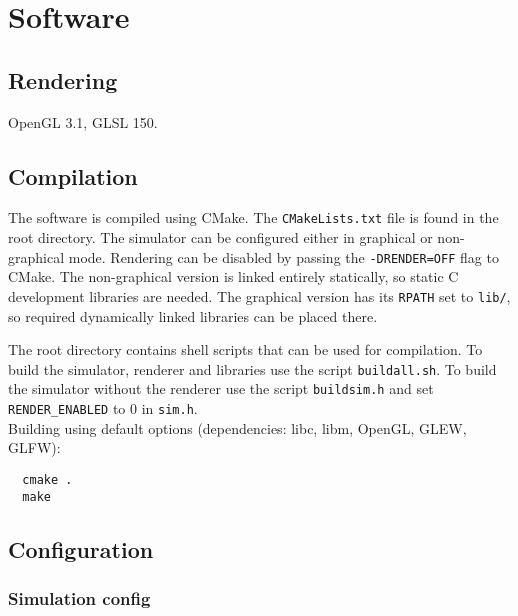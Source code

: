 \documentclass[12pt]{article}
\begin{document}
\section{Software}

\subsection{Rendering}

OpenGL 3.1, GLSL 150.

\subsection{Compilation}

The software is compiled using CMake. The \verb|CMakeLists.txt| file is found in the root directory. The simulator can be configured either in graphical or non-graphical mode. Rendering can be disabled by passing the \verb|-DRENDER=OFF| flag to CMake. The non-graphical version is linked entirely statically, so static C development libraries are needed. The graphical version has its \verb|RPATH| set to \verb|lib/|, so required dynamically linked libraries can be placed there.

The root directory contains shell scripts that can be used for compilation. To build the simulator, renderer and libraries use the script \verb|buildall.sh|. To build the simulator without the renderer use the script \verb|buildsim.h| and set \verb|RENDER_ENABLED| to 0 in \verb|sim.h|.\\
Building using default options (dependencies: libc, libm, OpenGL, GLEW, GLFW):
\begin{verbatim}
  cmake .
  make
\end{verbatim}

\subsection{Configuration}

\subsubsection{Simulation config}
\end{document}
